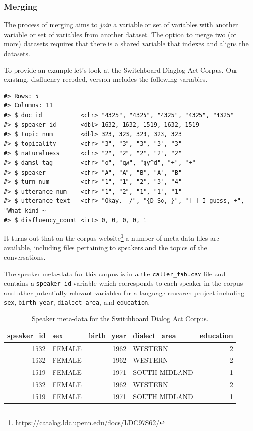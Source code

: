 \documentclass[
  letterpaper,
]{scrbook}
\DeclareRobustCommand{\href}[2]{#2\footnote{\url{#1}}}
\begin{document}
\hypertarget{merging}{%
\subsubsection{Merging}\label{merging}}

The process of merging aims to \emph{join} a variable or set of
variables with another variable or set of variables from another
dataset. The option to merge two (or more) datasets requires that there
is a shared variable that indexes and aligns the datasets.

To provide an example let's look at the Switchboard Diaglog Act Corpus.
Our existing, disfluency recoded, version includes the following
variables.

\begin{verbatim}
#> Rows: 5
#> Columns: 11
#> $ doc_id           <chr> "4325", "4325", "4325", "4325", "4325"
#> $ speaker_id       <dbl> 1632, 1632, 1519, 1632, 1519
#> $ topic_num        <dbl> 323, 323, 323, 323, 323
#> $ topicality       <chr> "3", "3", "3", "3", "3"
#> $ naturalness      <chr> "2", "2", "2", "2", "2"
#> $ damsl_tag        <chr> "o", "qw", "qy^d", "+", "+"
#> $ speaker          <chr> "A", "A", "B", "A", "B"
#> $ turn_num         <chr> "1", "1", "2", "3", "4"
#> $ utterance_num    <chr> "1", "2", "1", "1", "1"
#> $ utterance_text   <chr> "Okay.  /", "{D So, }", "[ [ I guess, +", "What kind ~
#> $ disfluency_count <int> 0, 0, 0, 0, 1
\end{verbatim}

It turns out that on the
\href{https://catalog.ldc.upenn.edu/docs/LDC97S62/}{corpus website} a
number of meta-data files are available, including files pertaining to
speakers and the topics of the conversations.

The speaker meta-data for this corpus is in a the
\texttt{caller\_tab.csv} file and contains a \texttt{speaker\_id}
variable which corresponds to each speaker in the corpus and other
potentially relevant variables for a language research project including
\texttt{sex}, \texttt{birth\_year}, \texttt{dialect\_area}, and
\texttt{education}.

\hypertarget{tbl-merging-swda-speaker}{}
\begin{table}
\caption{\label{tbl-merging-swda-speaker}Speaker meta-data for the Switchboard Dialog Act Corpus. }\tabularnewline

\centering
\begin{tabular}{rlrlr}
\toprule
speaker\_id & sex & birth\_year & dialect\_area & education\\
\midrule
1632 & FEMALE & 1962 & WESTERN & 2\\
1632 & FEMALE & 1962 & WESTERN & 2\\
1519 & FEMALE & 1971 & SOUTH MIDLAND & 1\\
1632 & FEMALE & 1962 & WESTERN & 2\\
1519 & FEMALE & 1971 & SOUTH MIDLAND & 1\\
\bottomrule
\end{tabular}
\end{table}
\end{document}
